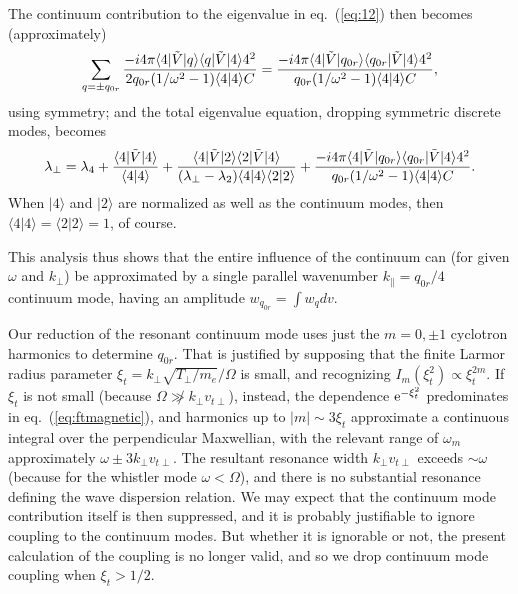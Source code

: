 \documentclass[12pt]{article}
\def\ket#1{|#1\rangle}
\def\bra#1{\langle#1}
\def\etothe#1{{\rm e}^{#1}}
\begin{document}
The continuum contribution to the eigenvalue in eq.\ (\ref{eq:12}) then
becomes (approximately)
\begin{equation}
  \label{eigcon}
  \sum_{q=\pm q_{0r}} {-i4\pi\bra{4}|\tilde V \ket{q}\bra{q}|\tilde{V}\ket{4}
    4^2 \over
    2q_{0r}(1/\omega^2-1)\bra{4}\ket{4}C}
  ={-i4\pi\bra{4}|\tilde V \ket{q_{0r}}\bra{q_{0r}}|\tilde{V}\ket{4}
    4^2 \over
    q_{0r}(1/\omega^2-1)\bra{4}\ket{4}C},
\end{equation}
using symmetry; and the total eigenvalue equation, dropping symmetric discrete modes, becomes
\begin{equation}
  \label{eigtotal}
  \lambda_\perp=\lambda_4+{\bra{4}|\tilde{V}\ket{4}\over
    \bra{4}\ket{4}}
    +{\bra{4}|\tilde{V}\ket{2}\bra{2}|\tilde{V}\ket{4}\over
      (\lambda_\perp-\lambda_2)\bra{4}\ket{4} \bra{2}\ket{2}}
    +%
    {-i4\pi\bra{4}|\tilde V \ket{q_{0r}}\bra{q_{0r}}|\tilde{V}\ket{4}4^2
    \over
    q_{0r}(1/\omega^2-1)\bra{4}\ket{4}C}.
\end{equation}
When $\ket{4}$ and $\ket{2}$ are normalized as well as the
continuum modes, then $\bra{4}\ket{4}=\bra{2}\ket{2}=1$, of
course.

This analysis thus shows that the entire influence of the continuum
can (for given $\omega$ and $k_\perp$) be approximated by a single
parallel wavenumber $k_\parallel= q_{0r}/4$ continuum mode, having an
amplitude $w_{q_{0r}}=\int w_q dv$.

Our reduction of the resonant continuum mode uses just the $m=0,\pm 1$
cyclotron harmonics to determine $q_{0r}.$ That is justified by
supposing that the finite Larmor radius parameter
$\xi_t=k_\perp\sqrt{T_\perp/m_e}/\Omega$ is small, and recognizing
$I_m(\xi_t^2)\propto \xi_t^{2m}$. If $\xi_t$ is not small (because
$\Omega\not\gg k_\perp v_{t\perp}$), instead, the dependence
$\etothe{-\xi_t^2}$ predominates in eq.\ (\ref{eq:ftmagnetic}), and
harmonics up to $|m|\sim 3\xi_t$ approximate a continuous integral
over the perpendicular Maxwellian, with the relevant range of
$\omega_m$ approximately $\omega\pm 3k_\perp v_{t\perp}$. The
resultant resonance width $k_\perp v_{t\perp}$ exceeds $\sim\omega$
(because for the whistler mode $\omega < \Omega$), and there is no
substantial resonance defining the wave dispersion relation. We may
expect that the continuum mode contribution itself is then suppressed,
and it is probably justifiable to ignore coupling to the continuum modes.
But whether it is ignorable or not, the present calculation of the
coupling is no longer valid, and so we drop continuum mode coupling when
$\xi_t>1/2$.
\end{document}
